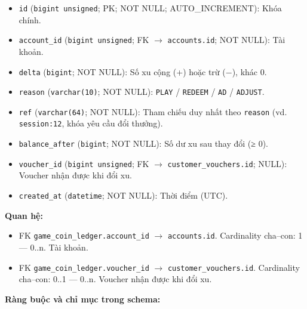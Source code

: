 \begin{itemize}

\item \texttt{id} (\texttt{bigint unsigned}; PK; NOT NULL; AUTO_INCREMENT): Khóa chính.

\item \texttt{account\_id} (\texttt{bigint unsigned}; FK $\rightarrow$ \texttt{accounts.id}; NOT NULL): Tài khoản.

\item \texttt{delta} (\texttt{bigint}; NOT NULL): Số xu cộng (+) hoặc trừ (−), khác 0.

\item \texttt{reason} (\texttt{varchar(10)}; NOT NULL): \texttt{PLAY} / \texttt{REDEEM} / \texttt{AD} / \texttt{ADJUST}.

\item \texttt{ref} (\texttt{varchar(64)}; NOT NULL): Tham chiếu duy nhất theo \texttt{reason} (vd. \texttt{session:12}, khóa yêu cầu đổi thưởng).

\item \texttt{balance\_after} (\texttt{bigint}; NOT NULL): Số dư xu sau thay đổi (≥ 0).

\item \texttt{voucher\_id} (\texttt{bigint unsigned}; FK $\rightarrow$ \texttt{customer\_vouchers.id}; NULL): Voucher nhận được khi đổi xu.

\item \texttt{created\_at} (\texttt{datetime}; NOT NULL): Thời điểm (UTC).

\end{itemize}

\textbf{Quan hệ:}

\begin{itemize}

\item FK \texttt{game\_coin\_ledger.account\_id} $\rightarrow$ \texttt{accounts.id}. Cardinality cha--con: 1 — 0..n. Tài khoản.

\item FK \texttt{game\_coin\_ledger.voucher\_id} $\rightarrow$ \texttt{customer\_vouchers.id}. Cardinality cha--con: 0..1 — 0..n. Voucher nhận được khi đổi xu.

\end{itemize}

\textbf{Ràng buộc và chỉ mục trong schema:}

